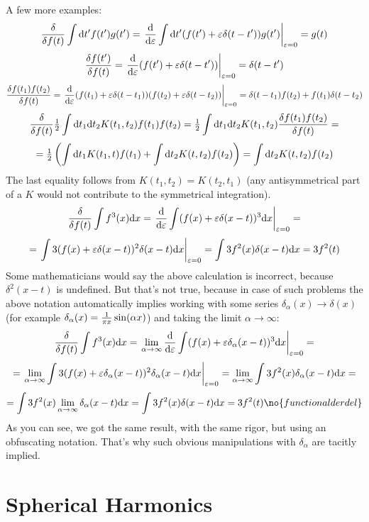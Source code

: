 A few more examples:
$${\delta\over\delta f(t)}\int{\rm d} t'f(t')g(t')=
\left.{{\rm d}\over{\rm d}\varepsilon}\int{\rm d} t'(f(t')+\varepsilon\delta(t-t'))g(t')
\right|_{\varepsilon=0}=g(t)$$
$${\delta f(t')\over\delta f(t)}=
\left.{{\rm d}\over{\rm d}\varepsilon}(f(t')+\varepsilon\delta(t-t'))
\right|_{\varepsilon=0}=\delta(t-t')$$
$${\delta f(t_1)f(t_2)\over\delta f(t)}=
\left.{{\rm d}\over{\rm d}\varepsilon}(f(t_1)+\varepsilon\delta(t-t_1))
(f(t_2)+\varepsilon\delta(t-t_2))
\right|_{\varepsilon=0}=\delta(t-t_1)f(t_2)+f(t_1)\delta(t-t_2)$$
$${\delta\over\delta f(t)}{\textstyle{1\over2}}\int{\rm d} t_1{\rm d} t_2K(t_1,t_2)f(t_1)f(t_2)=
{\textstyle{1\over2}}\int{\rm d} t_1{\rm d} t_2K(t_1,t_2){\delta f(t_1)f(t_2)\over\delta f(t)}=$$
$$={\textstyle{1\over2}}\left(\int{\rm d} t_1 K(t_1,t)f(t_1)+\int{\rm d} t_2 K(t,t_2)f(t_2)\right)
=\int{\rm d} t_2 K(t,t_2)f(t_2)$$
The last equality follows from $K(t_1,t_2)=K(t_2,t_1)$ (any antisymmetrical
part of a $K$ would not contribute to the symmetrical integration).
$${\delta\over\delta f(t)}\int f^3(x){\rm d} x=
\left.{{\rm d}\over{\rm d}\varepsilon}\int(f(x)+\varepsilon\delta(x-t))^3{\rm d} x
\right|_{\varepsilon=0}=$$
$$=\left.\int3(f(x)+\varepsilon\delta(x-t))^2\delta(x-t){\rm d} x
\right|_{\varepsilon=0}=\int3f^2(x)\delta(x-t){\rm d} x=3f^2(t)$$
Some mathematicians would say the above calculation is incorrect, because
$\delta^2(x-t)$ is undefined. But that's not true, because in case of such
problems the above notation
automatically implies working with some series $\delta_\alpha(x) \to \delta(x)$
(for example $\delta_\alpha(x) = {1\over\pi x}\sin(\alpha x)$)
and taking the limit $\alpha\to\infty$:
$${\delta\over\delta f(t)}\int f^3(x){\rm d} x=
\left.\lim_{\alpha\to\infty}{{\rm d}\over{\rm d}\varepsilon}\int(f(x)+\varepsilon\delta_\alpha(x-t))^3{\rm d} x
\right|_{\varepsilon=0}=$$
$$=\left.\lim_{\alpha\to\infty}\int3(f(x)+\varepsilon\delta_\alpha(x-t))^2\delta_\alpha(x-t){\rm d} x
\right|_{\varepsilon=0}=\lim_{\alpha\to\infty}\int3f^2(x)\delta_\alpha(x-t){\rm d} x=$$
$$=\int3f^2(x)\lim_{\alpha\to\infty}\delta_\alpha(x-t)\d x=
\int3f^2(x)\delta(x-t)\d x=3f^2(t)\no{functionalderdel}$$
As you can see, we got the same result, with the same rigor, but using an
obfuscating notation. That's why such obvious manipulations with $\delta_\alpha$
are tacitly implied.

\section{Spherical Harmonics}

